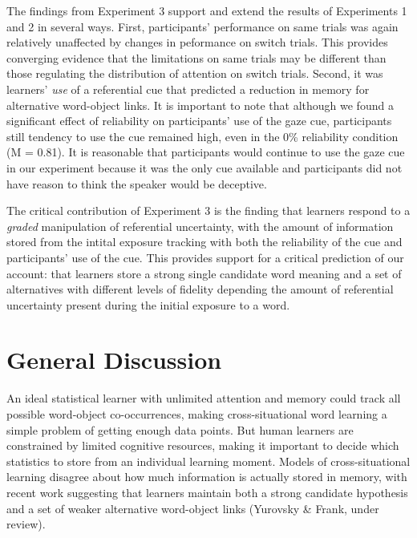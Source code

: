 \documentclass[12pt,]{article}
\begin{document}
The findings from Experiment 3 support and extend the results of
Experiments 1 and 2 in several ways. First, participants' performance on
same trials was again relatively unaffected by changes in peformance on
switch trials. This provides converging evidence that the limitations on
same trials may be different than those regulating the distribution of
attention on switch trials. Second, it was learners' \emph{use} of a
referential cue that predicted a reduction in memory for alternative
word-object links. It is important to note that although we found a
significant effect of reliability on participants' use of the gaze cue,
participants still tendency to use the cue remained high, even in the
0\% reliability condition (M = 0.81). It is reasonable that participants
would continue to use the gaze cue in our experiment because it was the
only cue available and participants did not have reason to think the
speaker would be deceptive.

The critical contribution of Experiment 3 is the finding that learners
respond to a \emph{graded} manipulation of referential uncertainty, with
the amount of information stored from the intital exposure tracking with
both the reliability of the cue and participants' use of the cue. This
provides support for a critical prediction of our account: that learners
store a strong single candidate word meaning and a set of alternatives
with different levels of fidelity depending the amount of referential
uncertainty present during the initial exposure to a word.

\section{General Discussion}\label{general-discussion}

An ideal statistical learner with unlimited attention and memory could
track all possible word-object co-occurrences, making cross-situational
word learning a simple problem of getting enough data points. But human
learners are constrained by limited cognitive resources, making it
important to decide which statistics to store from an individual
learning moment. Models of cross-situational learning disagree about how
much information is actually stored in memory, with recent work
suggesting that learners maintain both a strong candidate hypothesis and
a set of weaker alternative word-object links (Yurovsky \& Frank, under
review).
\end{document}
